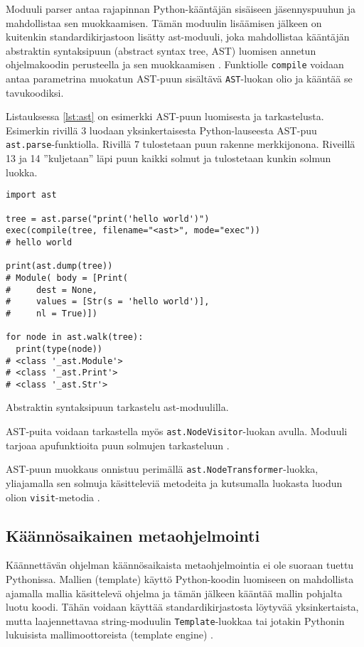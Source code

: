 \documentclass[finnish]{tktltiki2}
\theoremstyle{definition}
\theoremstyle{remark}
\begin{document}
Moduuli parser antaa rajapinnan Python-kääntäjän sisäiseen jäsennyspuuhun ja mahdollistaa sen muokkaamisen. Tämän moduulin lisäämisen jälkeen on kuitenkin standardikirjastoon lisätty ast-moduuli, joka mahdollistaa kääntäjän abstraktin syntaksipuun (abstract syntax tree, AST) luomisen annetun ohjelmakoodin perusteella ja sen muokkaamisen \cite{Green}. Funktiolle \verb|compile| voidaan antaa parametrina muokatun AST-puun sisältävä \verb|AST|-luokan olio ja kääntää se tavukoodiksi.

Listauksessa \ref{lst:ast} on esimerkki AST-puun luomisesta ja tarkastelusta. Esimerkin rivillä 3 luodaan yksinkertaisesta Python-lauseesta AST-puu \verb|ast.parse|-funktiolla. Rivillä 7 tulostetaan puun rakenne merkkijonona. Riveillä 13 ja 14 ''kuljetaan'' läpi puun kaikki solmut ja tulostetaan kunkin solmun luokka.

\begin{listing}[htb]
\begin{verbatim}
import ast

tree = ast.parse("print('hello world')")
exec(compile(tree, filename="<ast>", mode="exec"))
# hello world

print(ast.dump(tree))
# Module( body = [Print(
#     dest = None,
#     values = [Str(s = 'hello world')],
#     nl = True)])

for node in ast.walk(tree):
  print(type(node))
# <class '_ast.Module'>
# <class '_ast.Print'>
# <class '_ast.Str'>
\end{verbatim}
    \caption{Abstraktin syntaksipuun tarkastelu ast-moduulilla.}
    \label{lst:ast}
\end{listing}

AST-puita voidaan tarkastella myös \verb|ast.NodeVisitor|-luokan avulla. Moduuli tarjoaa apufunktioita puun solmujen tarkasteluun \cite{Green}.

AST-puun muokkaus onnistuu perimällä \verb|ast.NodeTransformer|-luokka, yliajamalla sen solmuja käsitteleviä metodeita ja kutsumalla luokasta luodun olion \verb|visit|-metodia \cite{Green}.


\subsection{Käännösaikainen metaohjelmointi}

Käännettävän ohjelman käännösaikaista metaohjelmointia ei ole suoraan tuettu Pythonissa. Mallien (template) käyttö Python-koodin luomiseen on mahdollista ajamalla mallia käsittelevä ohjelma ja tämän jälkeen kääntää mallin pohjalta luotu koodi. Tähän voidaan käyttää standardikirjastosta löytyvää yksinkertaista, mutta laajennettavaa string-moduulin \verb|Template|-luokkaa tai jotakin Pythonin lukuisista mallimoottoreista (template engine) \cite{Templating}.
\end{document}
